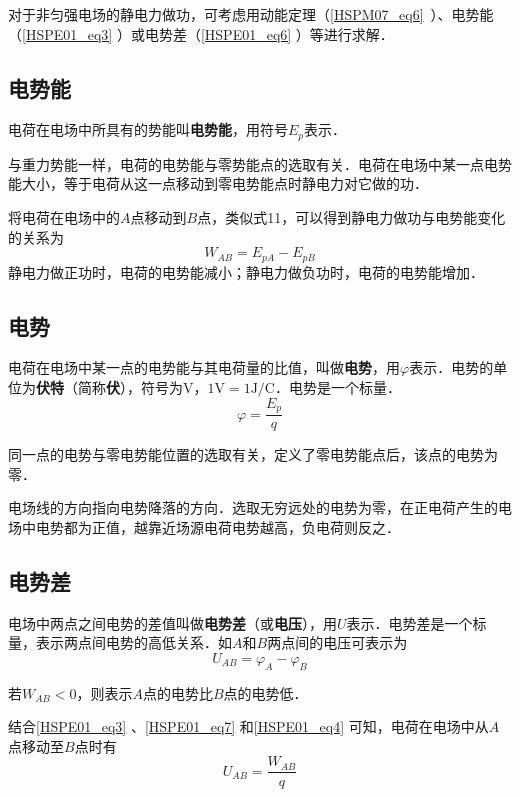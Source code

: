 对于非匀强电场的静电力做功，可考虑用动能定理（\autoref{HSPM07_eq6}~）、电势能（\autoref{HSPE01_eq3} ）或电势差（\autoref{HSPE01_eq6} ）等进行求解．

\subsection{电势能}

电荷在电场中所具有的势能叫\textbf{电势能}，用符号$E_p$表示．

与重力势能一样，电荷的电势能与零势能点的选取有关．电荷在电场中某一点电势能大小，等于电荷从这一点移动到零电势能点时静电力对它做的功．

将电荷在电场中的$A$点移动到$B$点，类似式11，可以得到静电力做功与电势能变化的关系为
\begin{equation}\label{HSPE01_eq3}
W_{AB}=E_{pA}-E_{pB}
\end{equation}
静电力做正功时，电荷的电势能减小；静电力做负功时，电荷的电势能增加．

\subsection{电势}

电荷在电场中某一点的电势能与其电荷量的比值，叫做\textbf{电势}，用$\varphi$表示．电势的单位为\textbf{伏特}（简称\textbf{伏}），符号为$\mathrm{V}$，$1\mathrm{V}=1\mathrm{J/C}$．电势是一个标量．
\begin{equation}\label{HSPE01_eq7}
\varphi = \frac{E_p}{q}
\end{equation}

同一点的电势与零电势能位置的选取有关，定义了零电势能点后，该点的电势为零．

电场线的方向指向电势降落的方向．选取无穷远处的电势为零，在正电荷产生的电场中电势都为正值，越靠近场源电荷电势越高，负电荷则反之．

\subsection{电势差}

电场中两点之间电势的差值叫做\textbf{电势差}（或\textbf{电压}），用$U$表示．电势差是一个标量，表示两点间电势的高低关系．如$A$和$B$两点间的电压可表示为
\begin{equation}\label{HSPE01_eq4}
U_{AB}=\varphi_A - \varphi_B
\end{equation}

若$W_{AB} < 0$，则表示$A$点的电势比$B$点的电势低．

结合\autoref{HSPE01_eq3} 、\autoref{HSPE01_eq7} 和\autoref{HSPE01_eq4} 可知，电荷在电场中从$A$点移动至$B$点时有
\begin{equation}\label{HSPE01_eq6}
U_{AB} = \frac{W_{AB}}{q}
\end{equation}

